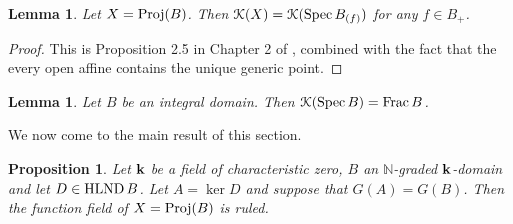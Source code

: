 \documentclass[12pt]{amsart}
\theoremstyle{plain}
\newtheorem{proposition}[subsection]{Proposition}
\newtheorem{lemma}[subsection]{Lemma}
\theoremstyle{definition}
\newcommand{\Spec}{		\operatorname{{\rm Spec}}}
\newcommand{\Proj}{		\operatorname{{\rm Proj}}}
\newcommand{\Frac}{		\operatorname{{\rm Frac}}}
\newcommand{\Nat}{\ensuremath{\mathbb{N}}}
\newcommand{\bk}{{\ensuremath{\rm \bf k}}}
\newcommand{\Keul}{\EuScript{K}}
\newcommand{\hlnd}{\operatorname{{\rm HLND}}}
\begin{document}
	\begin{lemma}\label{ffIrrelevant} Let $X = \Proj(B)$. Then $\Keul(X) = \Keul(\Spec B_{(f)})$ for any $f \in B_+$. 
	\end{lemma}
	\begin{proof}
		This is Proposition 2.5 in Chapter 2 of \cite{Hartshorne}, combined with the fact that the every open affine contains the unique generic point. 
	\end{proof}
	
	\begin{lemma}\label{functionFraction} Let $B$ be an integral domain. Then $\Keul(\Spec B) = \Frac B$. 
	\end{lemma}
	
	We now come to the main result of this section. 
	
	\begin{proposition} \label{mainResult} Let $\bk$ be a field of characteristic zero, $B$ an $\Nat$-graded $\bk$-domain and let $D \in \hlnd B$. Let $A = \ker D$ and suppose that $G(A) = G(B)$. Then the function field of $X = \Proj(B)$ is ruled.
	\end{proposition}
	
\end{document}
